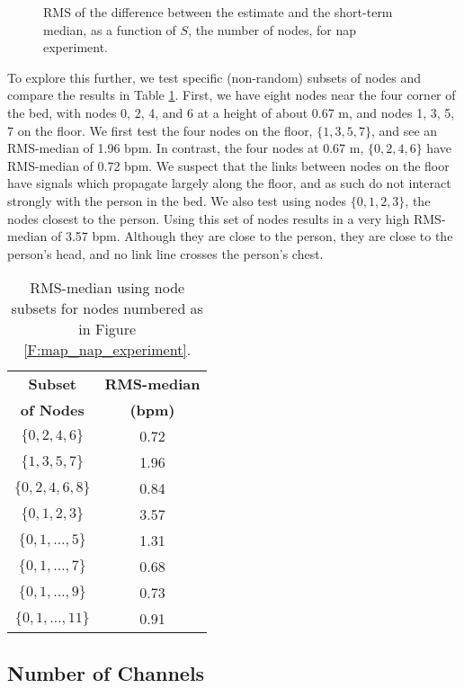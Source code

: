 \documentclass[10pt,journal,letterpaper]{IEEEtran}
\begin{document}
\begin{figure}[htbp]
\centerline{ }
\caption{RMS of the difference between the estimate and the short-term median, as a function of $S$, the number of nodes, for nap experiment.  }
    \label{F:rms_diff_from_median_random_subsets}
\end{figure}

To explore this further, we test specific (non-random) subsets of nodes and compare the results in Table \ref{T:SubsetResults}.  First, we have eight nodes near the four corner of the bed, with nodes 0, 2, 4, and 6 at a height of about 0.67 m, and nodes 1, 3, 5, 7 on the floor.  We first test the four nodes on the floor, $\{1,3,5,7\}$, and see an RMS-median of 1.96 bpm.  In contrast, the four nodes at 0.67 m, $\{0,2,4,6\}$ have RMS-median of 0.72 bpm.  We suspect that the links between nodes on the floor have signals which propagate largely along the floor, and as such do not interact strongly with the person in the bed.  We also test using nodes $\{0,1,2,3\}$, the nodes closest to the person.  Using this set of nodes results in a very high RMS-median of 3.57 bpm.  Although they are close to the person, they are close to the person's head, and no link line crosses the person's chest.  

\begin{table}[tbp]
\centering
\begin{tabular}{|cc|}
\hline
\bf Subset &  \bf RMS-median \\
\bf of Nodes & \bf (bpm) \\
\hline
$\{0,2,4,6\}$       & 0.72 \\ 
$\{1,3,5,7\}$       & 1.96 \\ 
$\{0,2,4,6,8\}$       & 0.84 \\ 
$\{0,1,2,3\}$       & 3.57 \\ 
$\{0,1, \ldots, 5\}$       & 1.31 \\ 
$\{0,1, \ldots, 7\}$       & 0.68 \\ 
$\{0,1, \ldots, 9\}$       & 0.73 \\ 
$\{0,1, \ldots, 11\}$       & 0.91 \\ 
\hline
\end{tabular}
\caption{RMS-median using node subsets for nodes numbered as in Figure \ref{F:map_nap_experiment}. } \label{T:SubsetResults}
\end{table}

\subsection{Number of Channels} \label{S:NumberOfChannels}
\end{document}
